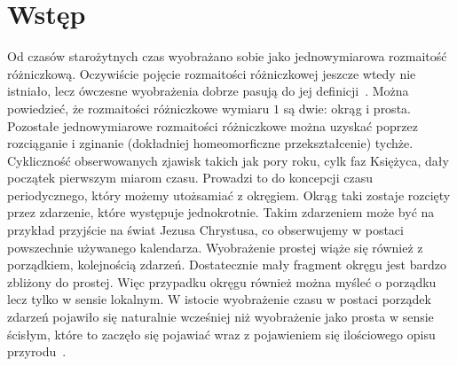 \newpage
\section{Wstęp}
Od czasów starożytnych czas wyobrażano sobie jako jednowymiarowa 
rozmaitość różniczkową. 
Oczywiście pojęcie rozmaitości różniczkowej jeszcze wtedy nie istniało, 
lecz ówczesne wyobrażenia dobrze pasują do jej 
definicji~\cite{heller1993fizyka}. 
Można powiedzieć, że rozmaitości różniczkowe 
 wymiaru $1$ są dwie: okrąg i prosta. 
Pozostałe jednowymiarowe rozmaitości różniczkowe można uzyskać 
poprzez rozciąganie i zginanie (dokładniej homeomorficzne przekształcenie) 
tychże. 
Cykliczność obserwowanych zjawisk takich jak pory roku, cylk faz 
Księżyca, dały początek pierwszym miarom czasu. 
Prowadzi to do koncepcji czasu periodycznego, który możemy 
utożsamiać z okręgiem. 
Okrąg taki zostaje rozcięty przez zdarzenie, które występuje 
jednokrotnie. Takim zdarzeniem może być na przykład 
przyjście na świat Jezusa Chrystusa, co 
obserwujemy w postaci powszechnie 
używanego kalendarza. 
Wyobrażenie prostej wiąże się również z porządkiem, 
kolejnością zdarzeń. 
Dostatecznie mały fragment okręgu jest bardzo zbliżony do
prostej. Więc przypadku okręgu również można myśleć o
 porządku lecz tylko w sensie lokalnym. 
W istocie wyobrażenie czasu w postaci porządek zdarzeń
pojawiło się naturalnie wcześniej niż wyobrażenie jako prosta 
w sensie ścisłym, które to zaczęło się pojawiać wraz 
z pojawieniem się ilościowego opisu przyrodu~\cite{czasHeller}.


